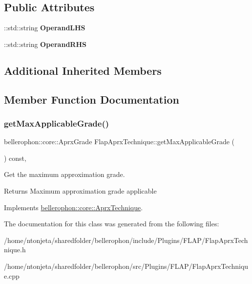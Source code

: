 \subsection*{Public Attributes}
\begin{DoxyCompactItemize}
\item 
\hypertarget{classFlapAprxTechnique_a47a8663a3b30bd8c8236bc4d759df2ac}{}\label{classFlapAprxTechnique_a47a8663a3b30bd8c8236bc4d759df2ac} 
\+::std\+::string {\bfseries Operand\+L\+HS}
\item 
\hypertarget{classFlapAprxTechnique_a776f631a4c4fba99575c6251a9e5d645}{}\label{classFlapAprxTechnique_a776f631a4c4fba99575c6251a9e5d645} 
\+::std\+::string {\bfseries Operand\+R\+HS}
\end{DoxyCompactItemize}
\subsection*{Additional Inherited Members}


\subsection{Member Function Documentation}
\hypertarget{classFlapAprxTechnique_af35c36c904e8c077c3fdf6bd35f5192c}{}\label{classFlapAprxTechnique_af35c36c904e8c077c3fdf6bd35f5192c} 
\subsubsection{\texorpdfstring{get\+Max\+Applicable\+Grade()}{getMaxApplicableGrade()}}
{\footnotesize\ttfamily bellerophon\+::core\+::\+Aprx\+Grade Flap\+Aprx\+Technique\+::get\+Max\+Applicable\+Grade (\begin{DoxyParamCaption}{ }\end{DoxyParamCaption}) const\hspace{0.3cm}{\ttfamily [override]}, {\ttfamily [virtual]}}



Get the maximum approximation grade. 

\begin{DoxyReturn}{Returns}
Maximum approximation grade applicable 
\end{DoxyReturn}


Implements \hyperlink{classbellerophon_1_1core_1_1AprxTechnique_a6bcebd487e19b535ee4097d21f7df5db}{bellerophon\+::core\+::\+Aprx\+Technique}.



The documentation for this class was generated from the following files\+:\begin{DoxyCompactItemize}
\item 
/home/ntonjeta/sharedfolder/bellerophon/include/\+Plugins/\+F\+L\+A\+P/Flap\+Aprx\+Technique.\+h\item 
/home/ntonjeta/sharedfolder/bellerophon/src/\+Plugins/\+F\+L\+A\+P/Flap\+Aprx\+Technique.\+cpp\end{DoxyCompactItemize}
